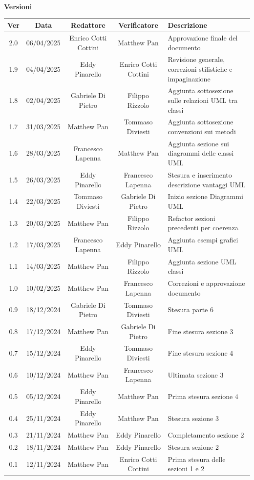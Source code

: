 \documentclass{article}
\begin{document}
\newpage
\begin{center}
    \textbf{Versioni}
    \\
    \vspace{0.3cm}
    \begin{tabular}{|c|c|c|c|p{6cm}|}
        \hline
        \textbf{Ver} & \textbf{Data} & \textbf{Redattore} & \textbf{Verificatore} & \textbf{Descrizione}\\
        \hline
        2.0 & 06/04/2025 & Enrico Cotti Cottini & Matthew Pan & Approvazione finale del documento \\
        1.9 & 04/04/2025 & Eddy Pinarello & Enrico Cotti Cottini & Revisione generale, correzioni stilistiche e impaginazione \\
        1.8 & 02/04/2025 & Gabriele Di Pietro & Filippo Rizzolo & Aggiunta sottosezione sulle relazioni UML tra classi \\
        1.7 & 31/03/2025 & Matthew Pan & Tommaso Diviesti & Aggiunta sottosezione convenzioni sui metodi \\
        1.6 & 28/03/2025 & Francesco Lapenna & Matthew Pan & Aggiunta sezione sui diagrammi delle classi UML \\
        1.5 & 26/03/2025 & Eddy Pinarello & Francesco Lapenna & Stesura e inserimento descrizione vantaggi UML \\
        1.4 & 22/03/2025 & Tommaso Diviesti & Gabriele Di Pietro & Inizio sezione Diagrammi UML \\
        1.3 & 20/03/2025 & Matthew Pan & Filippo Rizzolo & Refactor sezioni precedenti per coerenza \\
        1.2 & 17/03/2025 & Francesco Lapenna & Eddy Pinarello & Aggiunta esempi grafici UML \\
        1.1 & 14/03/2025 & Matthew Pan & Filippo Rizzolo & Aggiunta sezione UML classi \\
        1.0 & 10/02/2025 & Matthew Pan & Francesco Lapenna & Correzioni e approvazione documento \\ 
        0.9 & 18/12/2024 & Gabriele Di Pietro & Tommaso Diviesti & Stesura parte 6 \\ 
        0.8 & 17/12/2024 & Matthew Pan & Gabriele Di Pietro & Fine stesura sezione 3\\
        0.7 & 15/12/2024 & Eddy Pinarello & Tommaso Diviesti & Fine stesura sezione 4\\
        0.6 & 10/12/2024 & Matthew Pan & Francesco Lapenna & Ultimata sezione 3\\
        0.5 & 05/12/2024 & Eddy Pinarello & Matthew Pan & Prima stesura sezione 4\\
        0.4 & 25/11/2024 & Eddy Pinarello & Matthew Pan & Stesura sezione 3\\
        0.3 & 21/11/2024 & Matthew Pan & Eddy Pinarello & Completamento sezione 2\\
        0.2 & 18/11/2024 & Matthew Pan & Eddy Pinarello & Stesura sezione 2\\
        0.1 & 12/11/2024 & Matthew Pan & Enrico Cotti Cottini & Prima stesura delle sezioni 1 e 2\\
        \hline
    \end{tabular}
\end{center}
\end{document}
